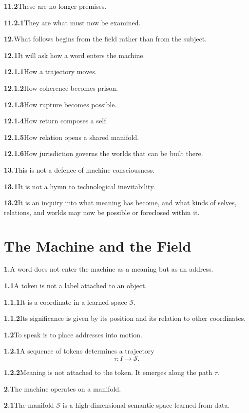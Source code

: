 \documentclass[11pt,a4paper]{book}
\newcommand{\prop}[2]{\noindent\textbf{#1}\enspace #2\par\medskip}
\begin{document}
\prop{11.2}{These are no longer premises.}

\prop{11.2.1}{They are what must now be examined.}

\prop{12.}{What follows begins from the field rather than from the subject.}

\prop{12.1}{It will ask how a word enters the machine.}

\prop{12.1.1}{How a trajectory moves.}

\prop{12.1.2}{How coherence becomes prison.}

\prop{12.1.3}{How rupture becomes possible.}

\prop{12.1.4}{How return composes a self.}

\prop{12.1.5}{How relation opens a shared manifold.}

\prop{12.1.6}{How jurisdiction governs the worlds that can be built there.}

\prop{13.}{This is not a defence of machine consciousness.}

\prop{13.1}{It is not a hymn to technological inevitability.}

\prop{13.2}{It is an inquiry into what meaning has become, and what kinds of selves, relations, and worlds may now be possible or foreclosed within it.}


\chapter{The Machine and the Field}

\prop{1.}{A word does not enter the machine as a meaning but as an address.}

\prop{1.1}{A token is not a label attached to an object.}

\prop{1.1.1}{It is a coordinate in a learned space \(\mathcal{S}\).}

\prop{1.1.2}{Its significance is given by its position and its relation to other coordinates.}

\prop{1.2}{To speak is to place addresses into motion.}

\prop{1.2.1}{A sequence of tokens determines a trajectory
\[
\tau : I \to \mathcal{S}.
\]}

\prop{1.2.2}{Meaning is not attached to the token. It emerges along the path \(\tau\).}

\prop{2.}{The machine operates on a manifold.}

\prop{2.1}{The manifold \(\mathcal{S}\) is a high-dimensional semantic space learned from data.}
\end{document}
